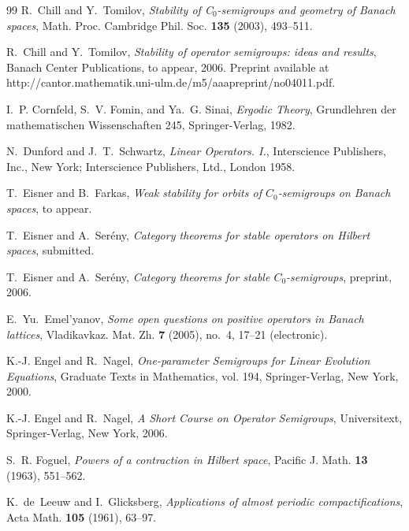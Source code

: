 \documentclass[11pt,intlimits, draft,oneside]{amsart}
\theoremstyle{definition}
\begin{document}
\begin{thebibliography}{99}
R.~Chill and Y.~Tomilov, %
\textit{Stability of {C}$_0$-semigroups and geometry of {B}anach spaces}, %
Math. Proc. Cambridge Phil. Soc. \textbf{135} (2003), 493--511. %


R.~Chill and Y.~Tomilov, %
\textit{Stability of operator semigroups: ideas and results}, %
Banach Center Publications, to appear, 2006.%
Preprint available at http://cantor.mathematik.uni-ulm.de/m5/aaapreprint/no04011.pdf. %


I.~P. Cornfeld, S.~V. Fomin, and Ya.~G. Sinai, %
\textit{Ergodic {T}heory}, %
Grundlehren der mathematischen Wissenschaften 245, Springer-Verlag, 1982. %


N.~Dunford and J.~T.~Schwartz, %
\textit{Linear {O}perators. I.}, %
Interscience Publishers, Inc., New York; Interscience Publishers, Ltd., London 1958. %


{T.~Eisner} and {B.~Farkas}, %
 \textit{Weak stability for orbits of $C_0$-semigroups on Banach spaces}, %
 to appear. %


{T.~Eisner} and {A.~Ser\'eny}, %
\textit{Category theorems for stable operators on Hilbert spaces}, %
submitted. %


{T.~Eisner} and {A.~Ser\'eny}, %
\textit{Category theorems for stable $C_0$-semigroups}, %
preprint, 2006. %

E.~Yu.~Emel'yanov, %
\textit{Some open questions on positive operators in Banach lattices}, %
Vladikavkaz. Mat. Zh.  \textbf{7}  (2005),  no.~4, 17--21 (electronic). %

K.-J. Engel and R.~Nagel, %
\textit{One-parameter {S}emigroups for {L}inear {E}volution {E}quations}, %
Graduate Texts in Mathematics, vol. 194, Springer-Verlag, New York, 2000. %

K.-J. Engel and R.~Nagel, %
\textit{A {S}hort {C}ourse on {O}perator {S}emigroups}, %
Universitext, Springer-Verlag, New York, 2006.  %

S.~R. Foguel, %
\textit{Powers of a contraction in {H}ilbert space}, %
Pacific J. Math. \textbf{13} (1963), 551--562.


K.~de~Leeuw and I.~Glicksberg, %
\textit{Applications of almost periodic compactifications}, %
Acta Math. \textbf{105} (1961), 63--97. %



\end{thebibliography}
\end{document}
